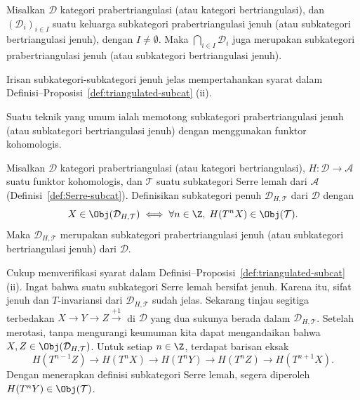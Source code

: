 \begin{proposisi}\label{prop:triangulated-subcat-intersection}
	Misalkan $\mathcal{D}$ kategori prabertriangulasi (atau kategori
	bertriangulasi), dan $(\mathcal{D}_i)_{i \in I}$ suatu keluarga subkategori
	prabertriangulasi jenuh (atau subkategori bertriangulasi jenuh), dengan
	$I \neq \emptyset$. Maka $\bigcap_{i \in I} \mathcal{D}_i$ juga merupakan
	subkategori prabertriangulasi jenuh (atau subkategori bertriangulasi jenuh).
\end{proposisi}

\begin{bukti}
	Irisan subkategori-subkategori jenuh jelas mempertahankan syarat dalam
	Definisi--Proposisi~\ref{def:triangulated-subcat} (ii).
\end{bukti}

Suatu teknik yang umum ialah memotong subkategori prabertriangulasi jenuh
(atau subkategori bertriangulasi jenuh) dengan menggunakan funktor
kohomologis.

\begin{proposisi}\label{prop:cut-subcat-by-cohomologies}
	Misalkan $\mathcal{D}$ kategori prabertriangulasi (atau kategori
	bertriangulasi), $H: \mathcal{D} \to \mathcal{A}$ suatu funktor
	kohomologis, dan $\mathcal{T}$ suatu subkategori Serre lemah dari
	$\mathcal{A}$ (Definisi~\ref{def:Serre-subcat}). Definisikan subkategori
	penuh $\mathcal{D}_{H, \mathcal{T}}$ dari $\mathcal{D}$ dengan
	\[ X \in \Obj(\mathcal{D}_{H, \mathcal{T}}) \iff \forall n \in \Z, \; H(T^n X) \in \Obj(\mathcal{T}). \]
	Maka $\mathcal{D}_{H, \mathcal{T}}$ merupakan subkategori
	prabertriangulasi jenuh (atau subkategori bertriangulasi jenuh) dari
	$\mathcal{D}$.
\end{proposisi}

\begin{bukti}
	Cukup memverifikasi syarat dalam
	Definisi--Proposisi~\ref{def:triangulated-subcat} (ii). Ingat bahwa suatu
	subkategori Serre lemah bersifat jenuh. Karena itu, sifat jenuh dan
	$T$-invariansi dari $\mathcal{D}_{H, \mathcal{T}}$ sudah jelas. Sekarang
	tinjau segitiga terbedakan $X \to Y \to Z \xrightarrow{+1}$ di
	$\mathcal{D}$ yang dua sukunya berada dalam
	$\mathcal{D}_{H, \mathcal{T}}$. Setelah merotasi, tanpa mengurangi keumuman
	kita dapat mengandaikan bahwa
	$X, Z \in \Obj(\mathcal{D}_{H, \mathcal{T}})$. Untuk setiap $n \in \Z$,
	terdapat barisan eksak
	\[ H(T^{n-1} Z) \to H(T^n X) \to H(T^n Y) \to H(T^n Z) \to H(T^{n+1} X). \]
	Dengan menerapkan definisi subkategori Serre lemah, segera diperoleh
	$H(T^n Y) \in \Obj(\mathcal{T})$.
\end{bukti}

